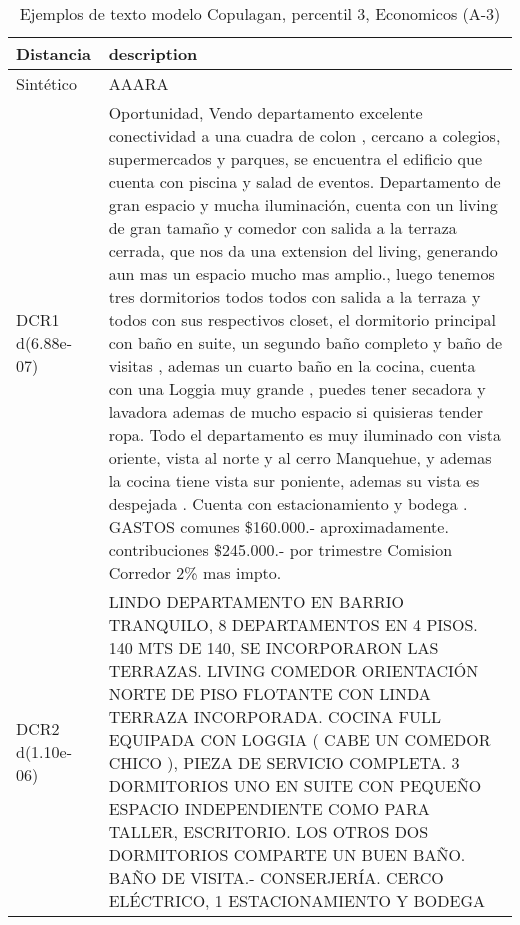 \begin{table}[H]
\centering
\fontsize{10}{14}\selectfont
\caption{Ejemplos de texto modelo Copulagan, percentil 3, Economicos (A-3)}
\label{table-example-economicos-a-3-copulagan-3p-text}
\begin{tabular}{|l|m{35em}|}
\hline
\rowcolor[gray]{0.8}
Distancia & description \\
\hline Sintético & AAARA \\
\hline DCR1 d(6.88e-07) & Oportunidad, Vendo departamento excelente conectividad a una cuadra de colon , cercano a colegios, supermercados y parques, se encuentra el edificio que cuenta con piscina y salad de eventos.
Departamento de gran espacio y mucha iluminaci\'on, cuenta con un living de gran tama\~no y comedor con salida a la terraza cerrada, que nos da una extension del living, generando aun mas un espacio mucho mas amplio., luego tenemos tres dormitorios todos todos con salida a la terraza y todos con sus respectivos closet, el dormitorio principal con ba\~no en suite, un segundo ba\~no completo y ba\~no de visitas , ademas un cuarto ba\~no en la cocina, cuenta con una Loggia muy grande , puedes tener secadora y lavadora ademas de mucho espacio si quisieras tender ropa.
Todo el departamento es muy iluminado con vista oriente, vista al norte y al cerro Manquehue, y ademas la cocina tiene vista sur poniente, ademas su vista es despejada .
Cuenta con estacionamiento y bodega .
GASTOS comunes \$160.000.- aproximadamente.
contribuciones \$245.000.- por trimestre 
Comision Corredor 2\% mas impto. \\
\hline DCR2 d(1.10e-06) & LINDO DEPARTAMENTO EN BARRIO TRANQUILO, 8 DEPARTAMENTOS EN 4 PISOS. 140 MTS DE 140, SE INCORPORARON LAS TERRAZAS. LIVING COMEDOR ORIENTACI\'ON NORTE DE PISO FLOTANTE CON LINDA TERRAZA INCORPORADA. COCINA FULL EQUIPADA CON LOGGIA ( CABE UN COMEDOR CHICO ), PIEZA DE SERVICIO COMPLETA. 3 DORMITORIOS UNO EN SUITE CON PEQUE\~NO ESPACIO INDEPENDIENTE COMO PARA TALLER, ESCRITORIO. LOS OTROS DOS DORMITORIOS COMPARTE UN BUEN BA\~NO. BA\~NO DE VISITA.- CONSERJER\'IA. CERCO EL\'ECTRICO, 1 ESTACIONAMIENTO Y BODEGA \\
\hline
\end{tabular}
\end{table}
